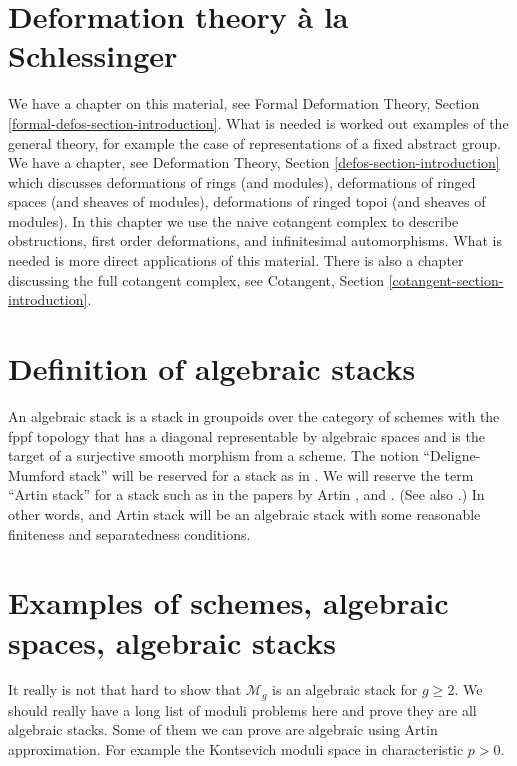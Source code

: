 \section{Deformation theory \`a la Schlessinger}
\label{section-deformation-schlessinger}

\noindent
We have a chapter on this material, see
Formal Deformation Theory, Section \ref{formal-defos-section-introduction}.
What is needed is worked out examples of the general theory, for example
the case of representations of a fixed abstract group.
We have a chapter, see
Deformation Theory, Section \ref{defos-section-introduction}
which discusses deformations of rings (and modules),
deformations of ringed spaces (and sheaves of modules),
deformations of ringed topoi (and sheaves of modules).
In this chapter we use the naive cotangent complex
to describe obstructions, first order deformations, and
infinitesimal automorphisms.
What is needed is more direct applications of this material.
There is also a chapter discussing the full cotangent complex, see
Cotangent, Section \ref{cotangent-section-introduction}.


\section{Definition of algebraic stacks}
\label{section-definition-algebraic-stacks}

\noindent
An algebraic stack is a stack in groupoids over the category of schemes
with the fppf topology that has a diagonal representable by algebraic
spaces and is the target of a surjective smooth morphism from a scheme.
The notion ``Deligne-Mumford stack'' will be reserved for a stack as in
\cite{DM}. We will reserve the term ``Artin stack'' for
a stack such as in the papers by Artin \cite{ArtinI}, and \cite{ArtinVersal}.
(See also \cite{conrad-dejong}.) In other words, and Artin stack will be an
algebraic stack with some reasonable finiteness and separatedness conditions.


\section{Examples of schemes, algebraic spaces, algebraic stacks}
\label{section-examples-stacks}

\noindent
It really is not that hard to show that $\mathcal{M}_g$ is an algebraic
stack for $g\geq 2$. We should really have a long list of moduli problems
here and prove they are all algebraic stacks. Some of them we can
prove are algebraic using Artin approximation. For example the Kontsevich
moduli space in characteristic $p > 0$.

